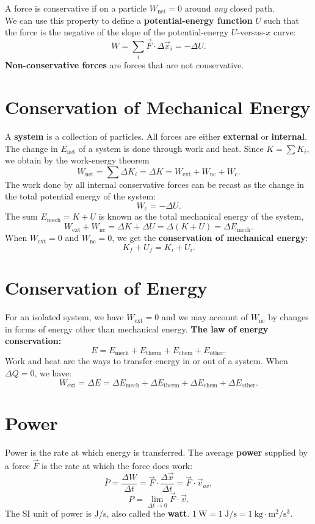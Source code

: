 \documentclass[11pt,a4paper]{report}
\begin{document}
A force is conservative if on a particle $W_\mathrm{net} = 0$ around \textit{any} closed path.
\\We can use this property to define a \textbf{potential-energy function} $U$ such that the force is the negative of the slope of the potential-energy $U$-versus-$x$ curve: $$W = \sum_i \vec{F} \cdot \Delta{\vec{x}_i} = -\Delta{U}.$$
\textbf{Non-conservative forces} are forces that are not conservative.

\section{Conservation of Mechanical Energy}
A \textbf{system} is a collection of particles. All forces are either \textbf{external} or \textbf{internal}. The change in $E_\mathrm{net}$ of a system is done through work and heat. Since $K = \sum{K_i}$, we obtain by the work-energy theorem $$W_\mathrm{net} = \sum{\Delta{K_i}} = \Delta{K} = W_\mathrm{ext} + W_\mathrm{nc} + W_\mathrm{c}.$$
The work done by all internal conservative forces can be recast as the change in the total potential energy of the system: $$W_\mathrm{c} = -\Delta{U}.$$
The sum $E_\mathrm{mech} = K + U$ is known as the total mechanical energy of the system, $$W_\mathrm{ext} + W_\mathrm{nc} = \Delta{K} + \Delta{U} = \Delta{\left(K + U\right)} = \Delta{E_\mathrm{mech}}.$$
When $W_\mathrm{ext} = 0$ and $W_\mathrm{nc} = 0$, we get the \textbf{conservation of mechanical energy}: $$K_f + U_f = K_i + U_i.$$

\section{Conservation of Energy}
For an isolated system, we have $W_\mathrm{ext} = 0$ and we may account of $W_\mathrm{nc}$ by changes in forms of energy other than mechanical energy. \textbf{The law of energy conservation:} $$E = E_\mathrm{mech} + E_\mathrm{therm} + E_\mathrm{chem} + E_\mathrm{other}.$$
Work and heat are the ways to transfer energy in or out of a system. When $\Delta{Q} = 0$, we have: $$W_\mathrm{ext} = \Delta{E} = \Delta{E_\mathrm{mech}} + \Delta{E_\mathrm{therm}} + \Delta{E_\mathrm{chem}} + \Delta{E_\mathrm{other}}.$$

\section{Power}
Power is the rate at which energy is transferred. The average \textbf{power} supplied by a force $\vec{F}$ is the rate at which the force does work: $$\bar{P} = \frac{\Delta{W}}{\Delta{t}} = \vec{F} \cdot \frac{\Delta{\vec{x}}}{\Delta{t}} = \vec{F} \cdot \vec{v}_{av},$$ $$P = \lim_{\Delta{t} \to 0} \vec{F} \cdot \vec{v}.$$
The SI unit of power is J/s, also called the \textbf{watt}. $1 \mathrm{\ W} = 1 \mathrm{\ J} / \mathrm{s} = 1 \mathrm{\ kg} \cdot \mathrm{m}^2 / \mathrm{s}^3$.
\end{document}
